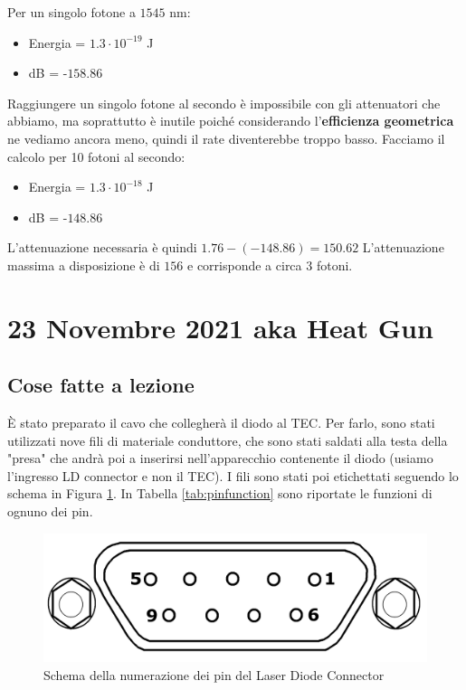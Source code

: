 \documentclass{article}
\numberwithin{equation}{section}
\begin{document}
\noindent Per un singolo fotone a $1545$ nm:
\begin{itemize}
    \item Energia = $1.3\cdot10^{-19}$ J
    \item dB = -$158.86$
\end{itemize}

\noindent Raggiungere un singolo fotone al secondo è impossibile con gli attenuatori che abbiamo, ma soprattutto è inutile poiché considerando l'\textbf{efficienza geometrica} ne vediamo ancora meno, quindi il rate diventerebbe troppo basso. 
Facciamo il calcolo per 10 fotoni al secondo:
\begin{itemize}
    \item Energia = $1.3\cdot10^{-18}$ J
    \item dB = -$148.86$
\end{itemize}
L'attenuazione necessaria è quindi $1.76-(-148.86) = 150.62$
L'attenuazione massima a disposizione è di $156$ e corrisponde a circa $3$ fotoni.

\section{23 Novembre 2021 aka Heat Gun}
\subsection{Cose fatte a lezione}
È stato preparato il cavo che collegherà il diodo al TEC. Per farlo, sono stati utilizzati nove fili di materiale conduttore, che sono stati saldati alla testa della "presa" che andrà poi a inserirsi nell'apparecchio contenente il diodo (usiamo l'ingresso LD connector e non il TEC). I fili sono stati poi etichettati seguendo lo schema in Figura \ref{fig:pin}. In Tabella \ref{tab:pinfunction} sono riportate le funzioni di ognuno dei pin. 
\begin{figure}[h]
    \centering
    \includegraphics[scale=0.3]{images/pin_scheme.png}
    \caption{Schema della numerazione dei pin del Laser Diode Connector}
    \label{fig:pin}
\end{figure}
\end{document}
